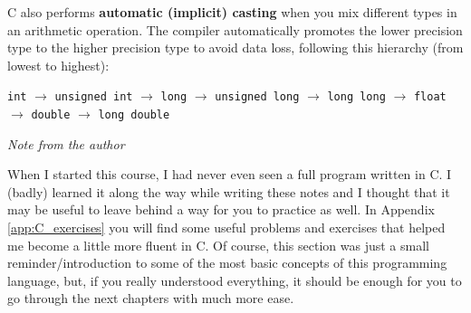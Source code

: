 C also performs \textbf{automatic (implicit) casting} when you mix different types in an arithmetic operation. The compiler automatically promotes the lower precision type to the higher precision type to avoid data loss, following this hierarchy (from lowest to highest):
\begin{center}
\small
    \texttt{int} $\rightarrow$ \texttt{unsigned int} $\rightarrow$ \texttt{long} $\rightarrow$ \texttt{unsigned long} $\rightarrow$ \texttt{long long} $\rightarrow$ \texttt{float} $\rightarrow$ \texttt{double} $\rightarrow$ \texttt{long double}
\end{center}



\hrulefill

\textit{Note from the author}

When I started this course, I had never even seen a full program written in C. I (badly) learned it along the way while writing these notes and I thought that it may be useful to leave behind a way for you to practice as well. In Appendix \ref{app:C_exercises} you will find some useful problems and exercises that helped me become a little more fluent in C. Of course, this section was just a small reminder/introduction to some of the most basic concepts of this programming language, but, if you really understood everything, it should be enough for you to go through the next chapters with much more ease.

\hrulefill













